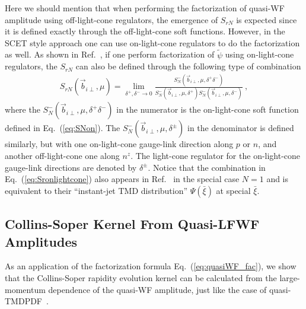 \documentclass[twocolumn,superscriptaddress,longbibliography,10pt]{revtex4-1}
\begin{document}
Here we should mention that when performing the factorization of quasi-WF amplitude using off-light-cone regulators, the emergence of $S_{rN}$ is expected since it is defined exactly through the off-light-cone soft functions. However, in the SCET style approach one can use on-light-cone regulators to do the factorization as well. As shown in Ref.~\cite{Ji:2020ect}, if one perform factorization of $\tilde \psi$ using on-light-cone regulators, the $S_{rN}$ can also be defined through the following type of combination
\begin{align} \label{eq:Sronlightcone}
    S_{rN}(\vec{b}_{i\perp},\mu)=\lim_{\delta^+,\delta^-\rightarrow 0}\frac{S_N^{-}(\vec{b}_{i\perp},\mu,\delta^+\delta^-)}{S_N^{-}(\vec{b}_{i\perp},\mu,\delta^+)S_N^{-}(\vec{b}_{i\perp},\mu,\delta^-)} \ ,
\end{align}
where the $S_N^{-}(\vec{b}_{i\perp},\mu,\delta^+\delta^-)$ in the numerator is the on-light-cone soft function defined in Eq.~(\ref{eq:SNon}).  The $S_N^{-}(\vec{b}_{i\perp},\mu,\delta^{\pm})$ in the denominator is defined similarly, but with one on-light-cone gauge-link direction along $p$ or $n$, and another off-light-cone one along $n^z$. The light-cone regulator for the on-light-cone gauge-link directions are denoted by $\delta^{\pm}$.  Notice that the combination in Eq.~(\ref{eq:Sronlightcone}) also appears in Ref.~\cite{Vladimirov:2020ofp} in the special case $N=1$ and is equivalent to their ``instant-jet TMD distribution'' $\Psi(\bar \xi)$ at special $\bar \xi$.


\subsection{Collins-Soper Kernel From Quasi-LFWF Amplitudes}

As an application of the factorization formula Eq.~(\ref{eq:quasiWF_fac}), we show that the Collins-Soper
rapidity evolution kernel can be calculated from the large-momentum dependence of the
quasi-WF amplitude, just like the case
of quasi-TMDPDF~\cite{Ji:2014hxa}.
\end{document}
